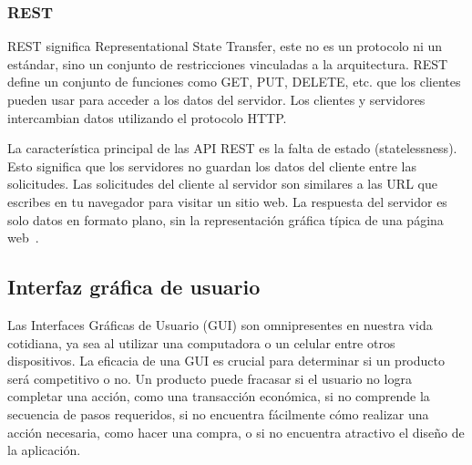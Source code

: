 \subsubsection{REST}
REST significa Representational State Transfer, este no es un protocolo ni un estándar, sino un conjunto de restricciones vinculadas a la arquitectura. REST define un conjunto de funciones como GET, PUT, DELETE, etc. que los clientes pueden usar para acceder a los datos del servidor. Los clientes y servidores intercambian datos utilizando el protocolo HTTP.

La característica principal de las API REST es la falta de estado (statelessness). Esto significa que los servidores no guardan los datos del cliente entre las solicitudes. Las solicitudes del cliente al servidor son similares a las URL que escribes en tu navegador para visitar un sitio web. La respuesta del servidor es solo datos en formato plano, sin la representación gráfica típica de una página web~\cite{APIDazzet}.

\subsection{Interfaz gráfica de usuario}
Las Interfaces Gráficas de Usuario (GUI) son omnipresentes en nuestra vida cotidiana, ya sea al utilizar una computadora o un celular entre otros dispositivos. La eficacia de una GUI es crucial para determinar si un producto será competitivo o no. Un producto puede fracasar si el usuario no logra completar una acción, como una transacción económica, si no comprende la secuencia de pasos requeridos, si no encuentra fácilmente cómo realizar una acción necesaria, como hacer una compra, o si no encuentra atractivo el diseño de la aplicación. ~\cite{interfazAlbornoz}
